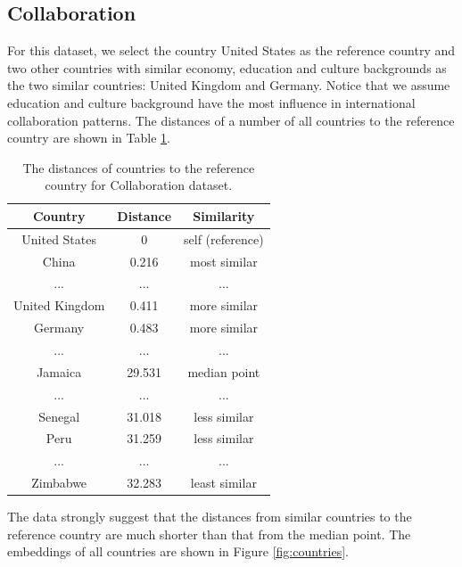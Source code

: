 \documentclass[conference]{IEEEtran}
\begin{document}
\subsection{Collaboration}
For this dataset, we select the country United States as the reference country and two other countries with similar economy, education and culture backgrounds as the two similar countries: United Kingdom and Germany.
Notice that we assume education and culture background have the most influence in international collaboration patterns.
The distances of a number of all countries to the reference country are shown in Table \ref{tab:countries-distance}.
\begin{table}[!ht]
	\centering
	\caption{
		The distances of countries to the reference country for Collaboration dataset.
	}
	\begin{tabular}{ccc} \hline \rowcolor{blue!30}
		Country & Distance & Similarity \\ \hline
		United States & 0 & self (reference) \\ \hline
		China & 0.216 & most similar \\ \hline
		... & ... & ... \\ \hline
		United Kingdom & 0.411 & more similar \\ \hline
		Germany & 0.483 & more similar \\ \hline
		... & ... & ... \\ \hline
		Jamaica & 29.531 & median point \\ \hline
		... & ... & ... \\ \hline
		Senegal & 31.018 & less similar \\ \hline
		Peru & 31.259 & less similar \\ \hline
		... & ... & ... \\ \hline
		Zimbabwe & 32.283 & least similar \\ \hline
	\end{tabular}
	\label{tab:countries-distance}
\end{table}
The data strongly suggest that the distances from similar countries to the reference country are much shorter than that from the median point.
The embeddings of all countries are shown in Figure \ref{fig:countries}.
\end{document}

